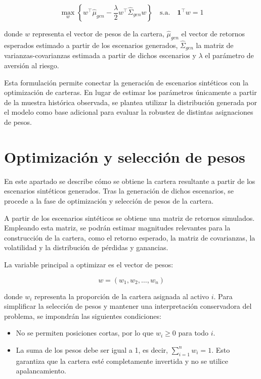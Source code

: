 \begin{equation}
\max_{w}
\left\{
w^{\top}\hat{\mu}_{gen}
-
\frac{\lambda}{2}
w^{\top}\hat{\Sigma}_{gen}w
\right\}
\quad
\text{s.a.}
\quad
\mathbf{1}^{\top}w = 1
\end{equation}

donde $w$ representa el vector de pesos de la cartera, $\hat{\mu}_{gen}$ el vector de retornos esperados estimado a partir de los escenarios generados, $\hat{\Sigma}_{gen}$ la matriz de varianzas-covarianzas estimada a partir de dichos escenarios y $\lambda$ el parámetro de aversión al riesgo.

Esta formulación permite conectar la generación de escenarios sintéticos con la optimización de carteras. En lugar de estimar los parámetros únicamente a partir de la muestra histórica observada, se plantea utilizar la distribución generada por el modelo como base adicional para evaluar la robustez de distintas asignaciones de pesos.

\section{Optimización y selección de pesos}

En este apartado se describe cómo se obtiene la cartera resultante a partir de los escenarios sintéticos generados. Tras la generación de dichos escenarios, se procede a la fase de optimización y selección de pesos de la cartera.

A partir de los escenarios sintéticos se obtiene una matriz de retornos simulados. Empleando esta matriz, se podrán estimar magnitudes relevantes para la construcción de la cartera, como el retorno esperado, la matriz de covarianzas, la volatilidad y la distribución de pérdidas y ganancias.

La variable principal a optimizar es el vector de pesos:

\begin{equation}
w = (w_1, w_2, \ldots, w_n)
\end{equation}

donde $w_i$ representa la proporción de la cartera asignada al activo $i$. Para simplificar la selección de pesos y mantener una interpretación conservadora del problema, se impondrán las siguientes condiciones:

\begin{itemize}
\item No se permiten posiciones cortas, por lo que $w_i \geq 0$ para todo $i$.
\item La suma de los pesos debe ser igual a 1, es decir, $\sum_{i=1}^{n} w_i = 1$. Esto garantiza que la cartera esté completamente invertida y no se utilice apalancamiento.
\end{itemize}


